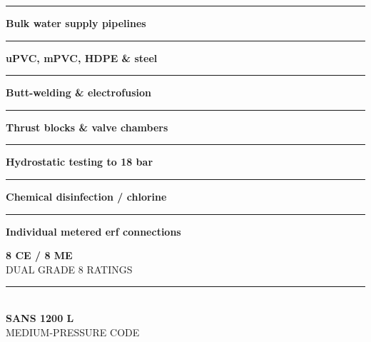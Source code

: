 \documentclass[a4paper,11pt]{article}
\begin{document}
\begin{minipage}[t]{0.34\textwidth}
    \vspace{0pt}
    \begin{tcolorbox}[
        enhanced, colback=mhoffwhite, colframe=mhnavy, boxrule=1pt, arc=4pt,
        title={\bfseries\color{white}\faTint\ Water Scope of Work},
        colbacktitle=mhnavy, left=7pt, right=7pt, top=6pt, bottom=6pt,
        drop shadow=black!6
    ]
        \fontsize{8.1pt}{11.6pt}\selectfont
        \textcolor{mhnavy}{\rule{4pt}{4pt}}\hspace{4pt}\textbf{Bulk water supply pipelines}\\
        \textcolor{mhnavy}{\rule{4pt}{4pt}}\hspace{4pt}\textbf{uPVC, mPVC, HDPE \& steel}\\
        \textcolor{mhnavy}{\rule{4pt}{4pt}}\hspace{4pt}\textbf{Butt-welding \& electrofusion}\\
        \textcolor{mhnavy}{\rule{4pt}{4pt}}\hspace{4pt}\textbf{Thrust blocks \& valve chambers}\\
        \textcolor{mhnavy}{\rule{4pt}{4pt}}\hspace{4pt}\textbf{Hydrostatic testing to 18 bar}\\
        \textcolor{mhnavy}{\rule{4pt}{4pt}}\hspace{4pt}\textbf{Chemical disinfection / chlorine}\\
        \textcolor{mhnavy}{\rule{4pt}{4pt}}\hspace{4pt}\textbf{Individual metered erf connections}
    \end{tcolorbox}

    \vspace{0.20cm}

    \begin{tcolorbox}[
        enhanced, colback=white, colframe=mhlightgray, boxrule=0.8pt, arc=4pt,
        left=6pt, right=6pt, top=6pt, bottom=6pt, halign=center,
        drop shadow=black!4
    ]
        {\fontsize{18pt}{20pt}\selectfont\bfseries\color{mhblue}8 CE / 8 ME}\\[1pt]
        {\fontsize{7.4pt}{9pt}\selectfont\color{mhtextmuted}\MakeUppercase{Dual Grade 8 Ratings}}\\[4pt]
        \textcolor{mhlightgray}{\rule{3.2cm}{0.6pt}}\\[4pt]
        {\fontsize{13pt}{15pt}\selectfont\bfseries\color{mhnavy}SANS 1200 L}\\[1pt]
        {\fontsize{7.2pt}{9pt}\selectfont\color{mhtextmuted}\MakeUppercase{Medium-Pressure Code}}
    \end{tcolorbox}
\end{minipage}
\end{document}
